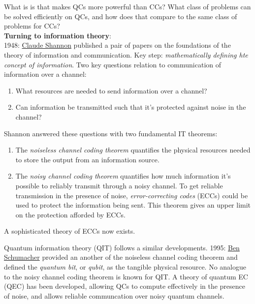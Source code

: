 \documentclass{article}
\numberwithin{equation}{section}
\begin{document}
What is is that makes QCs more powerful than CCs? What class of problems can be solved efficiently on QCs, and how does that compare to the same class of problems for CCs? \\

\textbf{Turning to information theory}: \\

1948: \href{https://en.wikipedia.org/wiki/Claude_Shannon}{Claude Shannon} published a pair of papers on the foundations of the theory of information and communication. Key step: \textit{mathematically defining hte concept of information}. Two key questions relation to communication of information over a channel:

\begin{enumerate}
\item What resources are needed to send information over a channel?
\item Can information be transmitted such that it's protected against noise in the channel?
\end{enumerate}

Shannon answered these questions with two fundamental IT theorems:

\begin{enumerate}
\item The \textit{noiseless channel coding theorem} quantifies the physical resources needed to store the output from an information source.
\item The \textit{noisy channel coding theorem} quantifies how much information it's possible to reliably transmit through a noisy channel. To get reliable transmission in the presence of noise, \textit{error-correcting codes} (ECCs) could be used to protect the information being sent. This theorem gives an upper limit on the protection afforded by ECCs.
\end{enumerate}

A sophisticated theory of ECCs now exists.

Quantum information theory (QIT) follows a similar developments. 1995: \href{https://en.wikipedia.org/wiki/Benjamin_Schumacher}{Ben Schumacher} provided an another of the noiseless channel coding theorem and defined the \textit{quantum bit}, or \textit{qubit}, as the tangible physical resource. No analogue to the noisy channel coding theorem is known for QIT. A theory of quantum EC (QEC) has been developed, allowing QCs to compute effectively in the presence of noise, and allows reliable communcation over noisy quantum channels.
\end{document}

